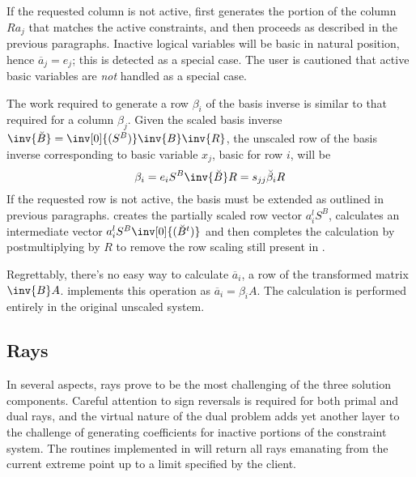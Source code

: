 If the requested column is not active, \dylp first generates the portion of the
column $R a_j$ that matches the active constraints, and then proceeds as
described in the previous paragraphs.
Inactive logical variables will be basic in natural position, hence
$\overline{a}_j = e_j$; this is detected as a special case.
The user is cautioned that active basic variables are \textit{not} handled as a
special case.


The work required to generate a row $\beta_i$ of the basis inverse is
similar to that required for a column $\beta_j$.
Given the scaled basis inverse
$\inv{\breve{B}} = \inv[0]{(S^B)}\inv{B}\inv{R}$, the unscaled row of the
basis inverse corresponding to basic variable $x_j$, basic for row $i$,
will be
\begin{equation*}
\beta_i = e_i S^B \inv{\breve{B}} R = s_{jj} \breve{\beta}_i R
\end{equation*}
If the requested row is not active, the basis must be extended as outlined in
previous paragraphs.
\Dylp creates the partially scaled row vector $a^l_i S^B$, calculates an
intermediate vector $a^l_i S^B \inv[0]{(\breve{B}^t)}$ and then completes the
calculation by postmultiplying by $R$ to remove the row scaling still present
in .

Regrettably, there's no easy way to calculate $\overline{a}_i$, a row of
the transformed matrix $\inv{B}A$.
\Dylp implements this operation as $\overline{a}_i = \beta_i A$.
The calculation is performed entirely in the original unscaled system.


\subsection{Rays}
\label{sec:Rays}

In several aspects, rays prove to be the most challenging of the three
solution components.
Careful attention to sign reversals is required for both primal and dual rays,
and the virtual nature of the dual problem adds yet another layer to the
challenge of generating coefficients for inactive portions of the constraint
system.
The routines implemented in \dylp will return all rays emanating from the
current extreme point up to a limit specified by the client.


